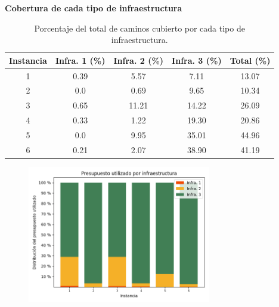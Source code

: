 \documentclass{article}
\begin{document}
  \begin{table}[h!]
    \centering
    \caption*{{\bf Cobertura de cada tipo de infraestructura}}
    \begin{tabular}{ccccc}
      \toprule
        Instancia & Infra. 1 (\%) & Infra. 2 (\%) & Infra. 3 (\%) & Total (\%) \\
      \midrule
        1 & 0.39 & 5.57 & 7.11 & 13.07 \\
        2 & 0.0  & 0.69 & 9.65 & 10.34 \\
        3 & 0.65 & 11.21 & 14.22 & 26.09 \\
        4 & 0.33 & 1.22 & 19.30 & 20.86 \\
        5 & 0.0  & 9.95 & 35.01 & 44.96 \\
        6 & 0.21 & 2.07 & 38.90 & 41.19 \\
      \bottomrule
    \end{tabular}
    \caption{Porcentaje del total de caminos cubierto por cada tipo de infraestructura.}
    \label{table:montevideoinfracoverage}
  \end{table}

  \begin{figure}[h!]
    \centering
    \includegraphics[width=8cm]{../resources/montevideo_budget_usage_by_infra.png}
      \caption{}
    \label{fig:montevideobudgetusage}
  \end{figure}
\end{document}
